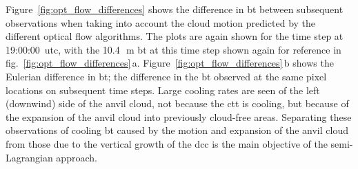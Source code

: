 Figure~\ref{fig:opt_flow_differences} shows the difference in \acrshort{bt} between subsequent observations when taking into account the cloud motion predicted by the different optical flow algorithms.
The plots are again shown for the time step at 19:00:00~\acrshort{utc}, with the 10.4\,\unit{\mu m} \acrshort{bt} at this time step shown again for reference in fig.~\ref{fig:opt_flow_differences}\,a.
Figure~\ref{fig:opt_flow_differences}\,b shows the Eulerian difference in \acrshort{bt}; the difference in the \acrshort{bt} observed at the same pixel locations on subsequent time steps.
Large cooling rates are seen of the left (downwind) side of the anvil cloud, not because the \acrshort{ctt} is cooling, but because of the expansion of the anvil cloud into previously cloud-free areas.
Separating these observations of cooling \acrshort{bt} caused by the motion and expansion of the anvil cloud from those due to the vertical growth of the \acrshort{dcc} is the main objective of the semi-Lagrangian approach.


